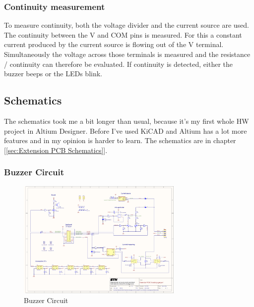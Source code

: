 \subsubsection{Continuity measurement}
To measure continuity, both the voltage divider and the current source are used. The continuity between the V and COM pins is measured. For this a constant current produced by the current source is flowing out of the V terminal. Simultaneously the voltage across those terminals is measured and the resistance / continuity can therefore be evaluated. If continuity is detected, either the buzzer beeps or the LEDs blink. \cite{DMM_Video_ElectroNoobs}
\\

\subsection{Schematics}
The schematics took me a bit longer than usual, because it's my first whole HW project in Altium Designer. Before I've used KiCAD and Altium has a lot more features and in my opinion is harder to learn. The schematics are in chapter [\ref{sec:Extension PCB Schematics}].

\subsubsection{Buzzer Circuit}

\begin{figure}[H]
	\centering
	\includegraphics[width=8cm, trim={3.4cm 19cm 28.5cm 2cm}, clip]{../../../5_Hardware/PCB_EXTENSION_CircuitVoyager_pre1/Project Outputs for PCB_EXT_CV_PRE1/Schematic_PCB_EXTENSION_CircuitVoyager_pre1.pdf}
	\caption{Buzzer Circuit}
	\label{fig:Buzzer Circuit}
\end{figure}

